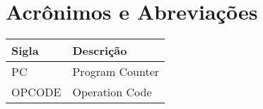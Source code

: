   \section{Acrônimos e Abreviações}
    \FloatBarrier
    \begin{table}[H]
      \begin{center}
        \begin{tabular}[pos]{|m{2cm} | m{12cm}|} 
          \hline
          \cellcolor[gray]{0.9}\textbf{Sigla} & \cellcolor[gray]{0.9}\textbf{Descrição} \\ \hline
          PC      &  Program Counter  \\ \hline
          OPCODE  &  Operation Code  \\ \hline
        \end{tabular}
      \end{center}
    \end{table}  
